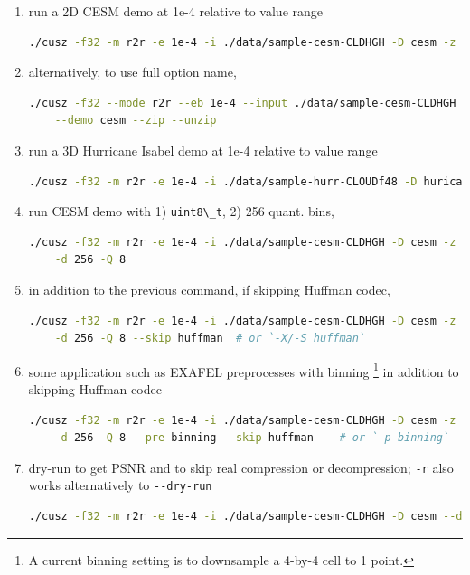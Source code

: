 \begin{enumerate}
\def\labelenumi{\arabic{enumi}.}
\item
  run a 2D CESM demo at 1e-4 relative to value range

\begin{lstlisting}[language=bash]
./cusz -f32 -m r2r -e 1e-4 -i ./data/sample-cesm-CLDHGH -D cesm -z -x
\end{lstlisting}
\item
  alternatively, to use full option name,

\begin{lstlisting}[language=bash]
./cusz -f32 --mode r2r --eb 1e-4 --input ./data/sample-cesm-CLDHGH \
    --demo cesm --zip --unzip
\end{lstlisting}
\item
  run a 3D Hurricane Isabel demo at 1e-4 relative to value range

\begin{lstlisting}[language=bash]
./cusz -f32 -m r2r -e 1e-4 -i ./data/sample-hurr-CLOUDf48 -D huricanne -z -x
\end{lstlisting}
\item
  run CESM demo with 1) \passthrough{\lstinline!uint8\_t!}, 2) 256
  quant. bins,

\begin{lstlisting}[language=bash]
./cusz -f32 -m r2r -e 1e-4 -i ./data/sample-cesm-CLDHGH -D cesm -z -x \
    -d 256 -Q 8
\end{lstlisting}
\item
  in addition to the previous command, if skipping Huffman codec,

\begin{lstlisting}[language=bash]
./cusz -f32 -m r2r -e 1e-4 -i ./data/sample-cesm-CLDHGH -D cesm -z -x \
    -d 256 -Q 8 --skip huffman  # or `-X/-S huffman`
\end{lstlisting}
\item
  some application such as EXAFEL preprocesses with binning \footnote{A
    current binning setting is to downsample a 4-by-4 cell to 1 point.}
  in addition to skipping Huffman codec

\begin{lstlisting}[language=bash]
./cusz -f32 -m r2r -e 1e-4 -i ./data/sample-cesm-CLDHGH -D cesm -z -x \
    -d 256 -Q 8 --pre binning --skip huffman    # or `-p binning`
\end{lstlisting}
\item
  dry-run to get PSNR and to skip real compression or decompression;
  \passthrough{\lstinline!-r!} also works alternatively to
  \passthrough{\lstinline!--dry-run!}

\begin{lstlisting}[language=bash]
./cusz -f32 -m r2r -e 1e-4 -i ./data/sample-cesm-CLDHGH -D cesm --dry-run   # or `-r`
\end{lstlisting}
\end{enumerate}

